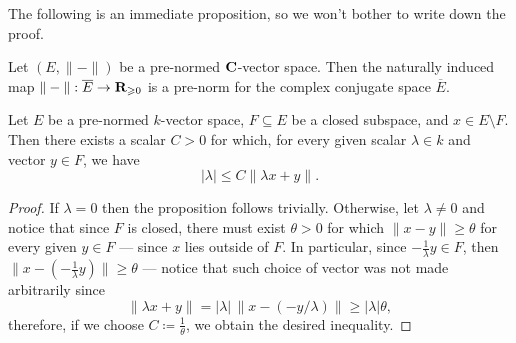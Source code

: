 The following is an immediate proposition, so we won't bother to write down
the proof.

\begin{lemma}
\label{lem:prenorm-complex-conjugate-space}
Let \((E, \| - \|)\) be a pre-normed \(\mathbf{C}\)-vector space. Then the naturally
induced map \(\| - \|: \overline{E} \to \mathbf{R}_{\geqslant 0}\) is a pre-norm for the
complex conjugate space \(\overline{E}\).
\end{lemma}

\begin{proposition}
Let \(E\) be a pre-normed \(k\)-vector space, \(F \subseteq E\) be a closed
subspace, and \(x \in E \setminus F\). Then there exists a scalar \(C > 0\)
for which, for every given scalar \(\lambda \in k\) and vector \(y \in F\), we
have
\[
|\lambda| \leq C \| \lambda x + y \|.
\]
\end{proposition}

\begin{proof}
If \(\lambda = 0\) then the proposition follows trivially. Otherwise, let
\(\lambda \neq 0\) and notice that since \(F\) is closed, there must exist
\(\theta > 0\) for which \(\| x - y \| \geq \theta\) for every given \(y \in F\)
--- since \(x\) lies outside of \(F\). In particular, since \(-\frac{1}{\lambda}
y \in F\), then \(\| x - (-\frac{1}{\lambda} y) \| \geq \theta\) --- notice that
such choice of vector was not made arbitrarily since
\[
\| \lambda x + y \|
= |\lambda|\, \| x - (- y / \lambda) \| \geq |\lambda| \theta,
\]
therefore, if we choose \(C \coloneq \frac{1}{\theta}\), we obtain the desired
inequality.
\end{proof}

